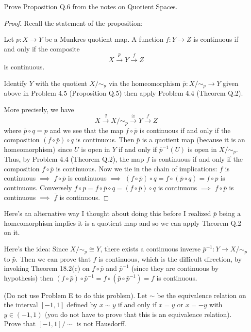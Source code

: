 \newpage
\begin{problem}[C]
Prove Proposition Q.6 from the notes on Quotient Spaces.
\end{problem}
\begin{proof}
Recall the statement of the proposition:
\begin{proposition*}[Proposition Q.6]
Let $p\colon X\to Y$ be a Munkres quotient map. A function
$f\colon Y\to Z$ is continuous if and only if the composite
\[
X\overset{p}{\longrightarrow}Y\overset{f}{\longrightarrow}Z
\]
is continuous.
\end{proposition*}
Identify $Y$ with the quotient $X/{\sim_p}$ via the homeomorphism
$\bar p\colon X/{\sim_p}\to Y$ given above in Problem 4.5
(Proposition Q.5) then apply Problem 4.4 (Theorem Q.2).

More precisely, we have
\[
X\overset{q}{\longrightarrow}X/{\sim_p}\overset{\cong}{\longrightarrow}Y\overset{f}{\longrightarrow}Z
\]
where $\bar p\circ q=p$ and we see that the map $f\circ \bar p$
is continuous if and only if the composition $\left(f\circ\bar
  p\right)\circ q$ is continuous. Then $\bar p$ is a quotient map
(because it is an homeomorphism) since $U$ is open in $Y$ if and
only if $\bar p^{-1}(U)$ is open in $X/{\sim_p}$. Thus, by
Problem 4.4 (Theorem Q.2), the map $f$ is continuous if and only
if the composition $f\circ\bar p$ is continuous. Now we tie in
the chain of implications: $f$ is continuous $\implies$ $f\circ
\bar p$ is continuous $\implies$ $(f\circ \bar p)\circ q=f\circ
(\bar p\circ q)=f\circ p$ is continuous. Conversely $f\circ
p=f\circ \bar p\circ q=(f\circ \bar p)\circ q$ is continuous
$\implies$ $f\circ\bar p$ is continuous $\implies$ $\bar f$ is
continuous.
\end{proof}
\begin{remarks*}
Here's an alternative way I thought about doing this before I
realized $\bar p$ being a homeomorphism implies it is a quotient
map and so we can apply Theorem Q.2 on it.

Here's the idea: Since $X/{\sim_p}\cong Y$, there exists a
continuous inverse $\bar p^{-1}\colon Y\to X/{\sim_p}$ to $\bar
p$. Then we can prove that $f$ is continuous, which is the
difficult direction, by invoking Theorem 18.2(c) on $f\circ\bar
p$ and $\bar p^{-1}$ (since they are continuous by hypothesis)
then $\left(f\circ\bar p\right)\circ\bar p^{-1}=f\circ\left(\bar
  p\circ\bar p^{-1}\right)=f$ is continuous.
\end{remarks*}
\newpage
\begin{problem}[D]
(Do not use Problem E to do this problem). Let $\sim$ be the
equivalence relation on the interval $[-1,1]$ defined by $x\sim
y$ if and only if $x=y$ or $x=-y$ with $y\in(-1,1)$ (you do not
have to prove that this is an equivalence relation). Prove that
$[-1,1]/{\sim}$ is not Hausdorff.
\end{problem}
